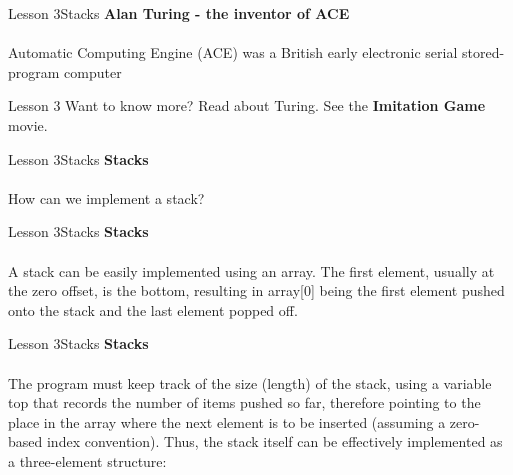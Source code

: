 \documentclass[aspectratio=1610]{beamer}
\begin{document}
\begin{frame}
\end{frame}


\begin{frame}{Lesson 3}{Stacks}
\LARGE
\textbf{Alan Turing - the inventor of ACE}\\~\\
Automatic Computing Engine (ACE) was a British early electronic
serial stored-program computer
\end{frame}


\begin{frame}
\end{frame}

\begin{frame}{Lesson 3}{}
\Huge
 Want to know more? Read about Turing. See the \textbf{Imitation Game}
 movie.
 \end{frame}
 

\begin{frame}
\end{frame}



\begin{frame}{Lesson 3}{Stacks}
\Huge 
\textbf{Stacks}\\~\\
How can we implement a stack? 
\end{frame}


\begin{frame}{Lesson 3}{Stacks}
\LARGE
\textbf{Stacks}\\~\\
A stack can be easily implemented using an array. The first
element, usually at the zero offset, is the bottom, resulting in
array[0] being the first element pushed onto the stack and the last
element popped off. 
\end{frame}

\begin{frame}{Lesson 3}{Stacks}
\LARGE
\textbf{Stacks}\\~\\
The program must keep track of the size (length) of the stack, using a variable top that records the number of items pushed so far, therefore pointing to the place in the array where the next element is to be inserted (assuming a zero-based index convention). Thus, the stack itself can be effectively implemented as a three-element structure:
\end{frame}
\end{document}
